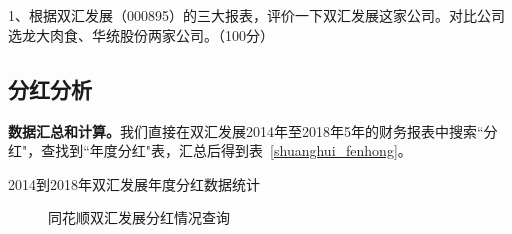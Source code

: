 
\chapter{}

1、根据双汇发展（000895）的三大报表，评价一下双汇发展这家公司。对比公司选龙大肉食、华统股份两家公司。（100分）
\hspace*{\fill} \\

{\kai


\section{分红分析}
\textbf{数据汇总和计算。}我们直接在双汇发展2014年至2018年5年的财务报表中搜索``分红"，查找到``年度分红"表，汇总后得到表~\ref{shuanghui_fenhong}。
\begin{table}[H]
\caption{2014到2018年双汇发展年度分红数据统计}
\label{shuanghui_fenhong}
\centering
\scalebox{0.6}{

}
\end{table}


\begin{figure}[!htbp]
\centering
{}
\caption{同花顺双汇发展分红情况查询}\label{shuanghui_fenhongpaixi}
\end{figure}







}
